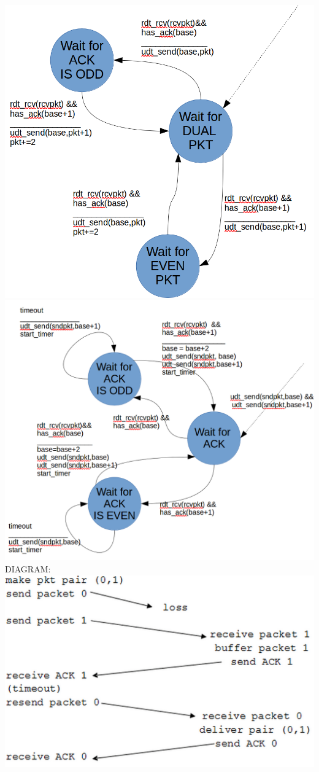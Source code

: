 \documentclass[a4paper,11pt]{article}
\theoremstyle{mytheor}
\begin{document}
\begin{enumerate}
    \includegraphics[width=\textwidth]{reciever_18_fsm}\\
    \pagebreak
    \includegraphics[width=\textwidth]{sender_18_fsm}
    DIAGRAM: \\
    \includegraphics[width=\textwidth]{packet_Sending_diagram}



\end{enumerate}
\end{document}
